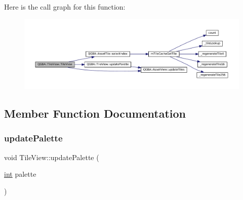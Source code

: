 Here is the call graph for this function\+:
\nopagebreak
\begin{figure}[H]
\begin{center}
\leavevmode
\includegraphics[width=350pt]{class_q_g_b_a_1_1_tile_view_af2a7f266052e05ca0a2378f63d6fb228_cgraph}
\end{center}
\end{figure}


\subsection{Member Function Documentation}
\mbox{\label{class_q_g_b_a_1_1_tile_view_a32d30c057994015181a0be9d2de123ab}} 
\subsubsection{\texorpdfstring{update\+Palette}{updatePalette}}
{\footnotesize\ttfamily void Tile\+View\+::update\+Palette (\begin{DoxyParamCaption}\item[{\mbox{\hyperlink{ioapi_8h_a787fa3cf048117ba7123753c1e74fcd6}{int}}}]{palette }\end{DoxyParamCaption})\hspace{0.3cm}{\ttfamily [slot]}}

